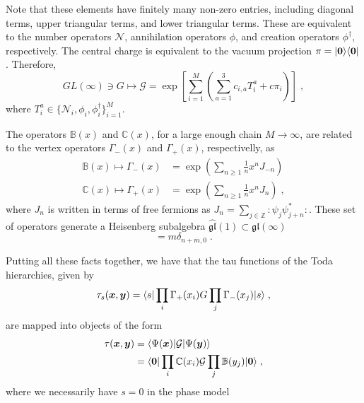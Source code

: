 \documentclass[a4paper,11pt]{amsart}
\begin{document}
Note that these elements have finitely many non-zero entries,
including diagonal terms, upper triangular terms, and lower triangular
terms. These are equivalent to the number operators \(\mathcal{N}\),
annihilation operators \(\phi\), and creation operators
\(\phi^\dagger\), respectively. The central charge is equivalent to
the vacuum projection \(\pi = \lvert\bm{0}\rangle\langle\bm{0}\rvert\). Therefore,
\begin{equation}
   GL(\infty) \ni G \mapsto
   \mathcal{G} = \exp \left[\sum_{i=1}^M \left( \sum_{a=1}^3
   c_{i, a} T_i^{a}  + c \pi_i \right)\right]\; ,
\end{equation}
where \(T^{a}_i \in \{ \mathcal{N}_i, \phi_i, \phi_i^\dagger \}_{i=1}^M\). 

The operators \(\mathbb{B}(x)\) and \(\mathbb{C}(x)\), 
for a large enough chain \(M\to \infty\),
are related to the vertex operators
\(\Gamma_-(x)\) and \(\Gamma_+(x)\), respectivelly, as
\begin{equation}
  \begin{split}
    \mathbb{B}(x) \mapsto \Gamma_-(x) & = \exp \left( \sum_{n\geq 1} \frac{1}{n}x^n J_{-n}\right) \\
    \mathbb{C}(x) \mapsto \Gamma_+(x) & = \exp \left( \sum_{n\geq 1} \frac{1}{n}x^n J_{n}\right) \; ,
  \end{split}
\end{equation}
where \(J_n \) is written in terms of free fermions as \(J_n =
\sum_{j\in \mathbb{Z}} \bm{\colon} \psi_j \psi_{j+n}^\ast
\bm{\colon}\). These set of operators generate a Heisenberg subalgebra
\(\widehat{\mathfrak{gl}}(1) \subset \mathfrak{gl}(\infty)\)
\begin{equation}
  [J_m, J_n] = m \delta_{n+m,0}\; .
\end{equation}

Putting all these facts together, we have that the tau functions of the Toda 
hierarchies, given by
\begin{equation}
  \tau_s(\bm{x}, \bm{y}) = \langle s\rvert \prod_{i} \Gamma_+(x_i) G \prod_j \Gamma_-(x_j) \lvert s\rangle\; ,
\end{equation}
are mapped into objects of the form 
\begin{equation}
\label{eq:tau-corr}
\begin{split}
  \tau(\bm{x}, \bm{y}) & = \langle\Psi(\bm{x})\rvert \mathcal{G} \lvert\Psi(\bm{y})\rangle \\
  & = \langle\bm{0}\rvert \prod_{i} \mathbb{C}(x_i)
  \mathcal{G} \prod_j \mathbb{B}(y_j) \lvert\bm{0}\rangle\; ,
\end{split}
\end{equation}
where we necessarily have \(s=0\) in the phase model
\end{document}
